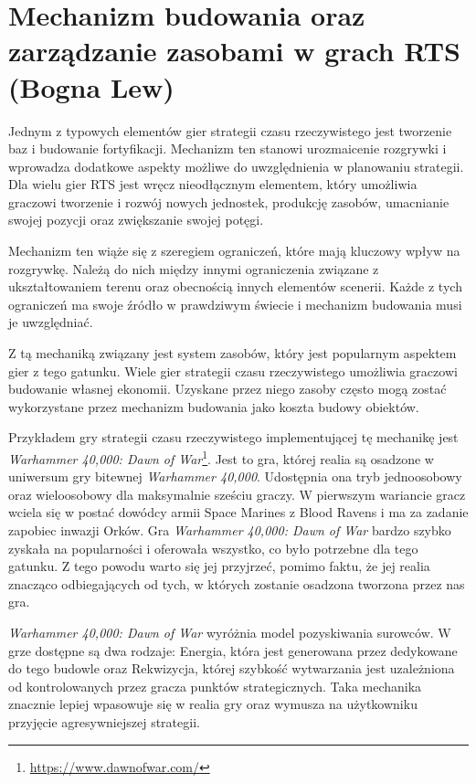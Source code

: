 \section{Mechanizm budowania oraz zarządzanie zasobami w grach RTS (Bogna Lew)}\label{s:budowanie}
Jednym z typowych elementów gier strategii czasu rzeczywistego  jest tworzenie baz i budowanie fortyfikacji. Mechanizm
ten stanowi urozmaicenie rozgrywki i wprowadza dodatkowe aspekty możliwe do uwzględnienia w planowaniu strategii. Dla
wielu gier RTS jest wręcz nieodłącznym elementem, który umożliwia graczowi tworzenie i rozwój nowych jednostek,
produkcję zasobów, umacnianie swojej pozycji oraz zwiększanie swojej potęgi.

Mechanizm ten wiąże się z szeregiem ograniczeń, które mają kluczowy wpływ na rozgrywkę. Należą do nich między innymi
ograniczenia związane z ukształtowaniem terenu oraz obecnością innych elementów scenerii. Każde z tych ograniczeń ma
swoje źródło w prawdziwym świecie i mechanizm budowania musi je uwzględniać.

Z tą mechaniką związany jest system zasobów, który jest popularnym aspektem gier z tego gatunku. Wiele gier strategii
czasu rzeczywistego umożliwia graczowi budowanie własnej ekonomii. Uzyskane przez niego zasoby często mogą zostać
wykorzystane przez mechanizm budowania jako koszta budowy obiektów.

Przykładem gry strategii czasu rzeczywistego implementującej tę mechanikę jest \textit{Warhammer 40,000: Dawn of War}\footnote{\url{https://www.dawnofwar.com/}}. Jest to
gra, której realia są osadzone w uniwersum gry bitewnej \textit{Warhammer 40,000}. Udostępnia ona tryb jednoosobowy oraz
wieloosobowy dla maksymalnie sześciu graczy. W pierwszym wariancie gracz wciela się w postać dowódcy
armii Space Marines z Blood Ravens i ma za zadanie zapobiec inwazji Orków. Gra \textit{Warhammer 40,000: Dawn of War} bardzo szybko
zyskała na popularności i oferowała wszystko, co było potrzebne dla tego gatunku. Z tego powodu warto się jej przyjrzeć,
pomimo faktu, że jej realia znacząco odbiegających od tych, w których zostanie osadzona tworzona przez nas gra.

\textit{Warhammer 40,000: Dawn of War} wyróżnia model pozyskiwania surowców. W grze dostępne są dwa rodzaje: Energia, która jest
generowana przez dedykowane do tego budowle oraz Rekwizycja, której szybkość wytwarzania jest uzależniona od kontrolowanych
przez gracza punktów strategicznych. Taka mechanika znacznie lepiej wpasowuje się w realia gry oraz wymusza na użytkowniku
przyjęcie agresywniejszej strategii.

